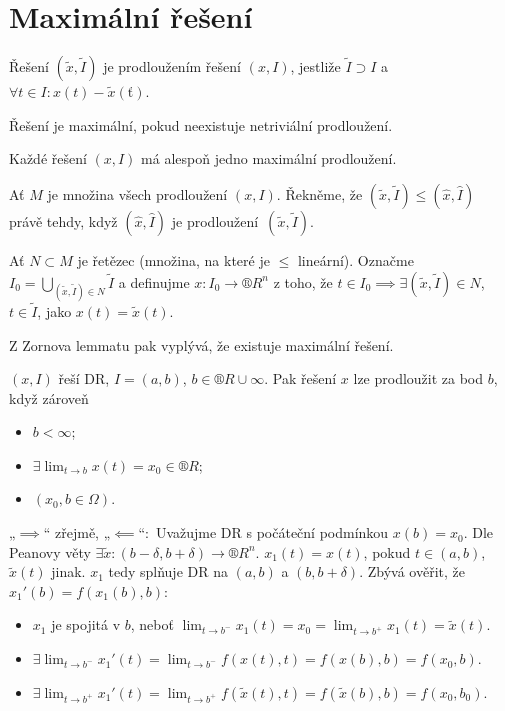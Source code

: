 \documentclass[12pt]{article}					%
\begin{document}
\section{Maximální řešení}
\begin{definice}
	Řešení $(\tilde x, \tilde I)$ je prodloužením řešení $(x, I)$, jestliže $\tilde I \supset I$ a $\forall t \in I: x(t) - \tilde x(ť)$.

	Řešení je maximální, pokud neexistuje netriviální prodloužení.
\end{definice}

\begin{veta}
	Každé řešení $(x, I)$ má alespoň jedno maximální prodloužení.

	\begin{dukazin}
		Ať $M$ je množina všech prodloužení $(x, I)$. Řekněme, že $(\tilde x, \tilde I) ≤ (\hat{x}, \hat{I})$ právě tehdy, když $(\hat{x}, \hat{I})$ je prodloužení $(\tilde x, \tilde I)$.

		Ať $N \subset M$ je řetězec (množina, na které je $≤$ lineární). Označme $I_0 = \bigcup_{(\tilde x, \tilde I) \in N} \tilde{I}$ a definujme $x: I_0 \rightarrow ®R^n$ z toho, že $t \in I_0 \implies \exists (\tilde x, \tilde I) \in N$, $t \in \tilde I$, jako $x(t) = \tilde x(t)$.

		Z Zornova lemmatu pak vyplývá, že existuje maximální řešení.
	\end{dukazin}
\end{veta}


\begin{lemma}
	$(x, I)$ řeší DR, $I = (a, b)$, $b \in ®R \cup ∞$. Pak řešení $x$ lze prodloužit za bod $b$, když zároveň

	\begin{itemize}
		\item $b < ∞$;
		\item $\exists \lim_{t \rightarrow b} x(t) = x_0 \in ®R$;
		\item $(x_0, b \in \Omega)$.
	\end{itemize}

	\begin{dukazin}
		„$\implies$“ zřejmě, „$\impliedby$“: Uvažujme DR s počáteční podmínkou $x(b) = x_0$. Dle Peanovy věty $\exists \tilde x: (b - \delta, b + \delta) \rightarrow ®R^n$. $x_1(t) = x(t)$, pokud $t \in (a, b)$, $\tilde x(t)$ jinak. $x_1$ tedy splňuje DR na $(a, b)$ a $(b, b + \delta)$. Zbývá ověřit, že $x_1'(b) = f(x_1(b), b)$:

		\begin{itemize}
			\item $x_1$ je spojitá v $b$, neboť $\lim_{t \rightarrow b^-} x_1(t) = x_0 = \lim_{t \rightarrow b^+} x_1(t) = \tilde x(t)$.
			\item $\exists \lim_{t \rightarrow b^-} x_1'(t) = \lim_{t \rightarrow b^-} f(x(t), t) = f(x(b), b) = f(x_0, b)$.
			\item $\exists \lim_{t \rightarrow b^+} x_1'(t) = \lim_{t \rightarrow b^+} f(\tilde x(t), t) = f(\tilde x(b), b) = f(x_0, b_0)$.
		\end{itemize}
	\end{dukazin}
\end{lemma}
\end{document}
